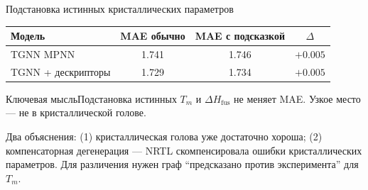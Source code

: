 \documentclass[aspectratio=169,10pt]{beamer}
\newcommand{\smallnote}[1]{{\scriptsize\color{TGSlate}#1}}
\newcommand{\keybox}[1]{\begin{block}{Ключевая мысль}#1\end{block}}
\begin{document}
\begin{frame}{Подстановка истинных кристаллических параметров}
  \small
  \centering
  \setlength{\tabcolsep}{5pt}
  \begin{tabular}{lccc}
    \toprule
    \textbf{Модель} & \textbf{MAE обычно} & \textbf{MAE с подсказкой} & \textbf{$\Delta$}\\
    \midrule
    TGNN MPNN & 1.741 & 1.746 & $+0.005$\\
    TGNN + дескрипторы & 1.729 & 1.734 & $+0.005$\\
    \bottomrule
  \end{tabular}

  \vspace{0.5em}
  \keybox{Подстановка истинных $T_m$ и $\Delta H_{\mathrm{fus}}$ не меняет MAE. Узкое место — не в кристаллической голове.}

  \smallnote{Два объяснения: (1) кристаллическая голова уже достаточно хороша; (2) компенсаторная дегенерация — NRTL скомпенсировала ошибки кристаллических параметров. Для различения нужен граф ``предсказано против эксперимента'' для $T_m$.}
\end{frame}
\end{document}
